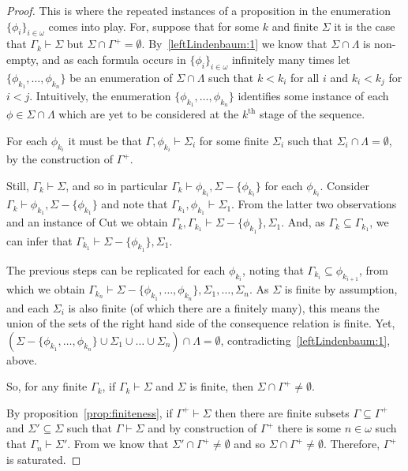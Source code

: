 \documentclass[10pt]{article}
\begin{document}
\begin{lemma}[Lindenbaum]
\begin{proof}
    This is where the repeated instances of a proposition in the enumeration \(\{\phi_{i}\}_{i \in \omega}\) comes into play.
    For, suppose that for some \(k\) and finite \(\Sigma\) it is the case that \(\Gamma_{k} \vdash \Sigma\) but \(\Sigma \cap \Gamma^{+} = \emptyset\).
    By~\ref{leftLindenbaum:1} we know that \(\Sigma \cap \Lambda\) is non-empty, and as each formula occurs in \(\{\phi_{i}\}_{i \in \omega}\) infinitely many times let \(\{\phi_{k_{1}}, \dots, \phi_{k_{n}}\}\) be an enumeration of \(\Sigma \cap \Lambda\) such that \(k < k_{i}\) for all \(i\) and \(k_{i} < k_{j}\) for \(i < j\).
    Intuitively, the enumeration \(\{\phi_{k_{1}}, \dots, \phi_{k_{n}}\}\) identifies some instance of each \(\phi \in \Sigma \cap \Lambda\) which are yet to be considered at the \(k^{\text{th}}\) stage of the sequence.

    For each \(\phi_{k_{i}}\) it must be that \mbox{\(\Gamma, \phi_{k_{i}} \vdash \Sigma_{i}\)} for some finite \(\Sigma_{i}\) such that \(\Sigma_{i} \cap \Lambda = \emptyset\), by the construction of \(\Gamma^{+}\).

    Still, \mbox{\(\Gamma_{k} \vdash \Sigma\)}, and so in particular \mbox{\(\Gamma_{k} \vdash \phi_{k_{i}},\Sigma - \{\phi_{k_{i}}\}\)} for each \(\phi_{k_{i}}\).
    Consider \mbox{\(\Gamma_{k} \vdash \phi_{k_{1}},\Sigma - \{\phi_{k_{1}}\}\)} and note that \mbox{\(\Gamma_{k_{1}}, \phi_{k_{1}} \vdash \Sigma_{1}\)}.
    From the latter two observations and an instance of Cut we obtain \mbox{\(\Gamma_{k}, \Gamma_{k_{1}} \vdash \Sigma - \{\phi_{k_{1}}\}, \Sigma_{1}\)}.
    And, as \mbox{\(\Gamma_{k} \subseteq \Gamma_{k_{1}}\)}, we can infer that \mbox{\(\Gamma_{k_{1}} \vdash \Sigma - \{\phi_{k_{1}}\}, \Sigma_{1}\)}.

    The previous steps can be replicated for each \(\phi_{k_{i}}\), noting that \(\Gamma_{k_{i}} \subseteq \phi_{k_{i+1}}\), from which we obtain \mbox{\(\Gamma_{k_{n}} \vdash \Sigma - \{\phi_{k_{1}},\dots,\phi_{k_{n}}\}, \Sigma_{1},\dots,\Sigma_{n}\)}.
    As \(\Sigma\) is finite by assumption, and each \(\Sigma_{i}\) is also finite (of which there are a finitely many), this means the union of the sets of the right hand side of the consequence relation is finite.
    Yet, \((\Sigma - \{\phi_{k_{1}},\dots,\phi_{k_{n}}\} \cup \Sigma_{1} \cup \dots \cup \Sigma_{n}) \cap \Lambda = \emptyset\), contradicting~\ref{leftLindenbaum:1}, above.

    So, for any finite \(\Gamma_{k}\), if \(\Gamma_{k} \vdash \Sigma\) and \(\Sigma\) is finite, then \(\Sigma \cap \Gamma^{+} \ne \emptyset\).

    By proposition~\ref{prop:finiteness}, if \(\Gamma^{+} \vdash \Sigma\) then there are finite subsets \(\Gamma \subseteq \Gamma^{+}\) and \(\Sigma' \subseteq \Sigma\) such that \(\Gamma \vdash \Sigma\) and by construction of \(\Gamma^{+}\) there is some \(n \in \omega\) such that \(\Gamma_{n} \vdash \Sigma'\).
    From \label{leftLindenbaum:2} we know that \(\Sigma' \cap \Gamma^{+} \ne \emptyset\) and so \(\Sigma \cap \Gamma^{+} \ne \emptyset\).
    Therefore, \(\Gamma^{+}\) is saturated.
  \end{proof}

\end{lemma}
\end{document}
